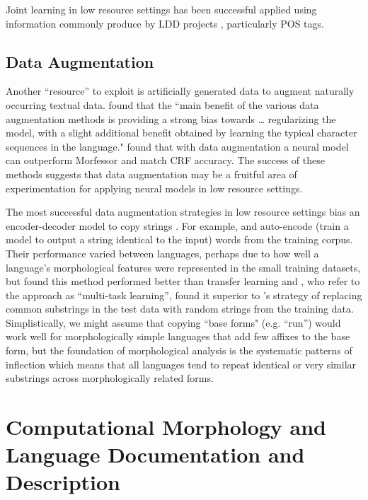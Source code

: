 \documentclass[12pt]{article}
\begin{document}
Joint learning in low resource settings has been successful applied using information commonly produce by LDD projects \cite{palmer_semi-automated_2009,moeller_automatic_2018}, particularly POS tags.

\subsection{Data Augmentation}
\label{augment}

Another ``resource'' to exploit is artificially generated data to augment naturally occurring textual data.  found that the ``main benefit of the various data augmentation methods is providing a strong bias towards … regularizing the model, with a slight additional benefit obtained by learning the typical character sequences in the language."  found that with data augmentation a neural model can outperform Morfessor and match CRF accuracy. The success of these methods suggests that data augmentation may be a fruitful area of experimentation for applying neural models in low resource settings.

The most successful data augmentation strategies in low resource settings bias an encoder-decoder model to copy strings \cite{bergmanis_training_2017,kann_fortification_2018,makarov_align_2017,makarov_uzh_2018}. For example,  and  auto-encode (train a model to output a string identical to the input) words from the training corpus. Their performance varied between languages, perhaps due to how well a language’s morphological features were represented in the small training datasets, but  found this method performed better than transfer learning and , who refer to the approach as ``multi-task learning'', found it superior to 's strategy of replacing common substrings in the test data with random strings from the training data.  Simplistically, we might assume that copying ``base forms" (e.g. ``run'') would work well for morphologically simple languages that add few affixes to the base form, but the foundation of morphological analysis is the systematic patterns of inflection which means that all languages tend to repeat identical or very similar substrings across morphologically related forms. 

\section{Computational Morphology and Language Documentation and Description}
\label{CLLDD}
\end{document}

